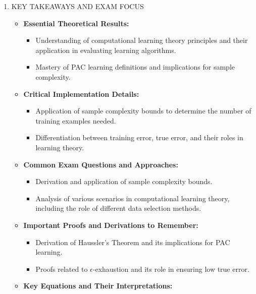 \documentclass[
  12pt,
]{report}
\providecommand{\tightlist}{%
  \setlength{\itemsep}{0pt}\setlength{\parskip}{0pt}}
\begin{document}
\begin{enumerate}
  \begin{itemize}
  \tightlist
  \item
    Example: Determining PAC-learnability for a hypothesis space of functions mapping input bits to output bits, given specific error and confidence levels.
  \item
    Performance is evaluated based on sample complexity bounds ensuring the desired accuracy and confidence.
  \end{itemize}
\item
  KEY TAKEAWAYS AND EXAM FOCUS

  \begin{itemize}
  \tightlist
  \item
    \textbf{Essential Theoretical Results:}

    \begin{itemize}
    \tightlist
    \item
      Understanding of computational learning theory principles and their application in evaluating learning algorithms.
    \item
      Mastery of PAC learning definitions and implications for sample complexity.
    \end{itemize}
  \item
    \textbf{Critical Implementation Details:}

    \begin{itemize}
    \tightlist
    \item
      Application of sample complexity bounds to determine the number of training examples needed.
    \item
      Differentiation between training error, true error, and their roles in learning theory.
    \end{itemize}
  \item
    \textbf{Common Exam Questions and Approaches:}

    \begin{itemize}
    \tightlist
    \item
      Derivation and application of sample complexity bounds.
    \item
      Analysis of various scenarios in computational learning theory, including the role of different data selection methods.
    \end{itemize}
  \item
    \textbf{Important Proofs and Derivations to Remember:}

    \begin{itemize}
    \tightlist
    \item
      Derivation of Haussler's Theorem and its implications for PAC learning.
    \item
      Proofs related to \(\epsilon\)-exhaustion and its role in ensuring low true error.
    \end{itemize}
  \item
    \textbf{Key Equations and Their Interpretations:}


\end{itemize}
\end{enumerate}
\end{document}
